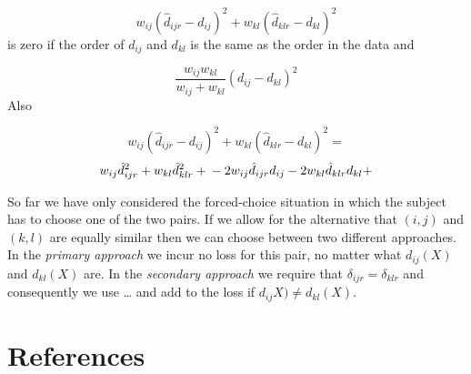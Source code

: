 \documentclass[
  12pt,
]{article}
\begin{document}
\[w_{ij}(\hat d_{ijr}-d_{ij})^2+w_{kl}(\hat d_{klr}-d_{kl})^2\]
is zero if the order of \(d_{ij}\) and \(d_{kl}\) is the same as the order in the data
and

\[
\frac{w_{ij}w_{kl}}{w_{ij}+w_{kl}}(d_{ij}-d_{kl})^2
\]
Also

\[w_{ij}(\hat d_{ijr}-d_{ij})^2+w_{kl}(\hat d_{klr}-d_{kl})^2=\]
\[
w_{ij}\hat d_{ijr}^2+w_{kl}\hat d_{klr}^2+\\
-2w_{ij}\hat d_{ijr}d_{ij}-2w_{kl}\hat d_{klr}d_{kl}+
\]

So far we have only considered the forced-choice situation in which
the subject has to choose one of the two pairs. If we allow for the alternative that \((i,j)\) and \((k,l)\) are equally similar then we can choose between two different approaches. In the \emph{primary approach} we incur no loss for this pair, no matter what \(d_{ij}(X)\) and \(d_{kl}(X)\) are. In the \emph{secondary approach} we require that \(\delta_{ijr}=\delta_{klr}\) and consequently we use \ldots{} and add to the loss if
\(d_{ij}X)\not= d_{kl}(X)\).

\section*{References}\label{references}
\end{document}
